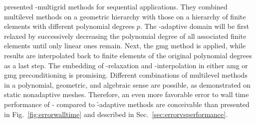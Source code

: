\textcite{mitchell2010} presented \hp-multigrid methods for sequential applications. They combined multilevel methods on a geometric hierarchy with those on a hierarchy of finite elements with different polynomial degrees $p$. The \hp-adaptive domain will be first relaxed by successively decreasing the polynomial degree of all associated finite elements until only linear ones remain. Next, the \gls{gmg} method is applied, while results are interpolated back to finite elements of the original polynomial degrees as a last step. The embedding of \p-relaxation and \p-interpolation in either \gls{amg} or \gls{gmg} preconditioning is promising. Different combinations of multilevel methods in a polynomial, geometric, and algebraic sense are possible, as \textcite{fehn2019} demonstrated on static nonadaptive meshes. %
Therefore, an even more favorable error to wall time performance of \hp- compared to \h-adaptive methods are conceivable than presented in Fig.~\ref{fig:errorwalltime} and described in Sec.~\ref{sec:errorvsperformance}.

